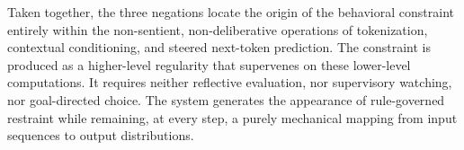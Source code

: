 Taken together, the three negations locate the origin of the behavioral constraint entirely within the non-sentient, non-deliberative operations of tokenization, contextual conditioning, and steered next-token prediction. The constraint is produced as a higher-level regularity that supervenes on these lower-level computations. It requires neither reflective evaluation, nor supervisory watching, nor goal-directed choice. The system generates the appearance of rule-governed restraint while remaining, at every step, a purely mechanical mapping from input sequences to output distributions.
